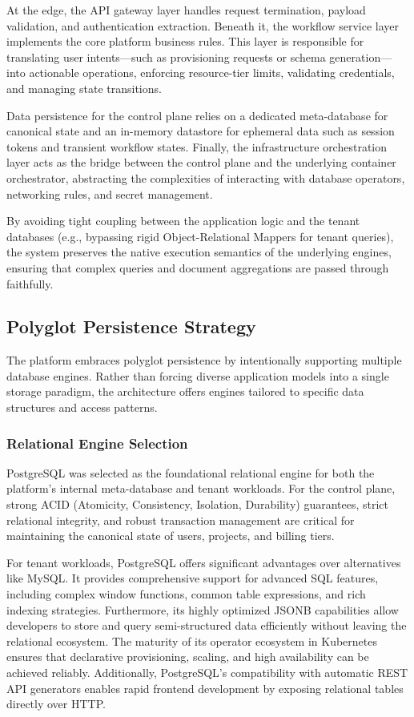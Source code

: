 At the edge, the API gateway layer handles request termination, payload validation, and authentication extraction. Beneath it, the workflow service layer implements the core platform business rules. This layer is responsible for translating user intents—such as provisioning requests or schema generation—into actionable operations, enforcing resource-tier limits, validating credentials, and managing state transitions. 

Data persistence for the control plane relies on a dedicated meta-database for canonical state and an in-memory datastore for ephemeral data such as session tokens and transient workflow states. Finally, the infrastructure orchestration layer acts as the bridge between the control plane and the underlying container orchestrator, abstracting the complexities of interacting with database operators, networking rules, and secret management. 

By avoiding tight coupling between the application logic and the tenant databases (e.g., bypassing rigid Object-Relational Mappers for tenant queries), the system preserves the native execution semantics of the underlying engines, ensuring that complex queries and document aggregations are passed through faithfully.

\subsection{Polyglot Persistence Strategy}

The platform embraces polyglot persistence by intentionally supporting multiple database engines. Rather than forcing diverse application models into a single storage paradigm, the architecture offers engines tailored to specific data structures and access patterns.

\subsubsection*{Relational Engine Selection}

PostgreSQL was selected as the foundational relational engine for both the platform's internal meta-database and tenant workloads. For the control plane, strong ACID (Atomicity, Consistency, Isolation, Durability) guarantees, strict relational integrity, and robust transaction management are critical for maintaining the canonical state of users, projects, and billing tiers. 

For tenant workloads, PostgreSQL offers significant advantages over alternatives like MySQL. It provides comprehensive support for advanced SQL features, including complex window functions, common table expressions, and rich indexing strategies. Furthermore, its highly optimized JSONB capabilities allow developers to store and query semi-structured data efficiently without leaving the relational ecosystem. The maturity of its operator ecosystem in Kubernetes ensures that declarative provisioning, scaling, and high availability can be achieved reliably. Additionally, PostgreSQL's compatibility with automatic REST API generators enables rapid frontend development by exposing relational tables directly over HTTP.

